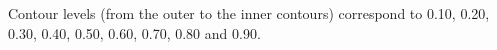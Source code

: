 Contour levels (from the outer to the inner contours) correspond to 0.10, 0.20, 0.30, 0.40, 0.50, 0.60, 0.70, 0.80 and 0.90.
